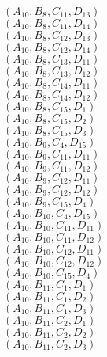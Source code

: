 \documentclass[14pt]{article}
\begin{document}
    $({A}_{10}, {B}_{8}, {C}_{11}, {D}_{13}) $ \\ 
    $({A}_{10}, {B}_{8}, {C}_{11}, {D}_{14}) $ \\ 
    $({A}_{10}, {B}_{8}, {C}_{12}, {D}_{13}) $ \\ 
    $({A}_{10}, {B}_{8}, {C}_{12}, {D}_{14}) $ \\ 
    $({A}_{10}, {B}_{8}, {C}_{13}, {D}_{11}) $ \\ 
    $({A}_{10}, {B}_{8}, {C}_{13}, {D}_{12}) $ \\ 
    $({A}_{10}, {B}_{8}, {C}_{14}, {D}_{11}) $ \\ 
    $({A}_{10}, {B}_{8}, {C}_{14}, {D}_{12}) $ \\ 
    $({A}_{10}, {B}_{8}, {C}_{15}, {D}_{1}) $ \\ 
    $({A}_{10}, {B}_{8}, {C}_{15}, {D}_{2}) $ \\ 
    $({A}_{10}, {B}_{8}, {C}_{15}, {D}_{3}) $ \\ 
    $({A}_{10}, {B}_{9}, {C}_{4}, {D}_{15}) $ \\ 
    $({A}_{10}, {B}_{9}, {C}_{11}, {D}_{11}) $ \\ 
    $({A}_{10}, {B}_{9}, {C}_{11}, {D}_{12}) $ \\ 
    $({A}_{10}, {B}_{9}, {C}_{12}, {D}_{11}) $ \\ 
    $({A}_{10}, {B}_{9}, {C}_{12}, {D}_{12}) $ \\ 
    $({A}_{10}, {B}_{9}, {C}_{15}, {D}_{4}) $ \\ 
    $({A}_{10}, {B}_{10}, {C}_{4}, {D}_{15}) $ \\ 
    $({A}_{10}, {B}_{10}, {C}_{11}, {D}_{11}) $ \\ 
    $({A}_{10}, {B}_{10}, {C}_{11}, {D}_{12}) $ \\ 
    $({A}_{10}, {B}_{10}, {C}_{12}, {D}_{11}) $ \\ 
    $({A}_{10}, {B}_{10}, {C}_{12}, {D}_{12}) $ \\ 
    $({A}_{10}, {B}_{10}, {C}_{15}, {D}_{4}) $ \\ 
    $({A}_{10}, {B}_{11}, {C}_{1}, {D}_{1}) $ \\ 
    $({A}_{10}, {B}_{11}, {C}_{1}, {D}_{2}) $ \\ 
    $({A}_{10}, {B}_{11}, {C}_{1}, {D}_{3}) $ \\ 
    $({A}_{10}, {B}_{11}, {C}_{2}, {D}_{1}) $ \\ 
    $({A}_{10}, {B}_{11}, {C}_{2}, {D}_{2}) $ \\ 
    $({A}_{10}, {B}_{11}, {C}_{2}, {D}_{3}) $ \\ 
\end{document}
